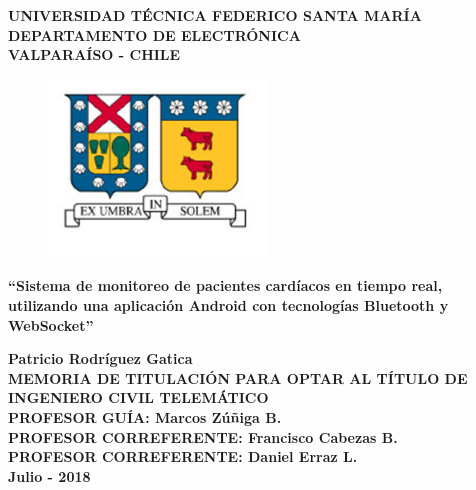 \documentclass[12pt,spanish]{thesis}
\begin{document}
\thispagestyle{empty}

\begin{center}
\renewcommand{\baselinestretch}{1.15}
\textbf{\large{UNIVERSIDAD TÉCNICA FEDERICO SANTA MARÍA\\}
\normalsize{DEPARTAMENTO DE ELECTRÓNICA\\VALPARAÍSO - CHILE\\}}

\vspace{0.5cm}
\begin{figure}[H]
\centering
  \includegraphics[width=5.85cm]{figuras/usmLogo.png}
\end{figure}
\vspace{0.5cm}

\renewcommand{\baselinestretch}{1}
\hangindent=0cm
\textbf{\Large ``Sistema de monitoreo de pacientes cardíacos en tiempo real, utilizando una aplicación Android con tecnologías Bluetooth y WebSocket''\\}
\vspace{3cm}

\hangindent=0cm\large \textbf{Patricio Rodríguez Gatica}\\
\vspace{0.5cm}
\hangindent=0cm\normalsize \textbf{MEMORIA DE TITULACIÓN PARA OPTAR AL TÍTULO DE INGENIERO CIVIL TELEMÁTICO}\\

\vspace{1.5cm}
\hangindent=0cm\normalsize \textbf{PROFESOR GUÍA: \hspace{5cm} Marcos Zúñiga B.}\\

\vspace{0.5cm}
\hangindent=0cm\normalsize \textbf{PROFESOR CORREFERENTE: \hspace{2cm} Francisco Cabezas B.}\\

\vspace{0.5cm}
\hangindent=0cm\normalsize \textbf{PROFESOR CORREFERENTE: \hspace{3cm} Daniel Erraz L.}\\

\vspace{1.5cm}
\hangindent=0cm\normalsize \textbf{Julio - 2018}\\

\end{center}
\end{document}
